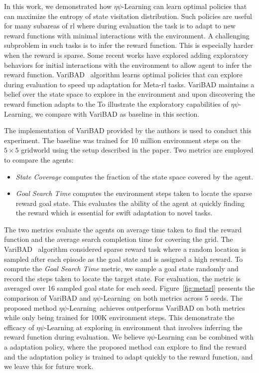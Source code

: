 \documentclass{article}
\theoremstyle{plain}
\theoremstyle{definition}
\theoremstyle{remark}
\newcommand{\alg}{$\eta$$\psi$-Learning}
\begin{document}
In this work, we demonstrated how $\eta\psi$-Learning can learn optimal policies that can maximize the entropy of state visitation distribution. Such policies are useful for many subareas of \gls{rl} where during evaluation the task is to adapt to new reward functions with minimal interactions with the environment. 
A challenging subproblem in such tasks is to infer the reward function. This is especially harder when the reward is sparse. 
Some recent works have explored adding exploratory behaviors for initial interactions with the environment to allow agent to infer the reward function. 
VariBAD~\citep{zintgraf2019varibad} algorithm learns optimal policies that can explore during evaluation to speed up adaptation for Meta-\gls{rl} tasks. 
VariBAD maintains a belief over the state space to explore in the environment and upon discovering the reward function adapts to the 
To illustrate the exploratory capabilities of \alg{}, we compare with VariBAD as baseline in this section. 

The implementation of VariBAD provided by the authors is used to conduct this experiment.
The baseline was trained for 10 million environment steps on the $5\times5$ gridworld using the setup described in the paper.
Two metrics are employed to compare the agents:
\begin{itemize}
    \item \textit{State Coverage} computes the fraction of the state space covered by the agent.
    \item \textit{Goal Search Time} computes the environment steps taken to locate the sparse reward goal state. This evaluates the ability of the agent at quickly finding the reward which is essential for swift adaptation to novel tasks.
\end{itemize}
The two metrics evaluate the agents on average time taken to find the reward function and the average search completion time for covering the grid. 
The VariBAD~\cite{zintgraf2019varibad} algorithm considered sparse reward task where a random location is sampled after each episode as the goal state and is assigned a high reward.  
To compute the \textit{Goal Search Time} metric, we sample a goal state randomly and record the steps taken to locate the target state.
For evaluation, the metric is averaged over 16 sampled goal state for each seed.
Figure~\ref{fig:metarl} presents the comparison of VariBAD and \alg{}~on both metrics across 5 seeds.
The proposed method \alg{}~achieves outperforms VariBAD on both metrics while only being trained for 100K environment steps. 
This demonstrate the efficacy of \alg{} at exploring in environment that involves inferring the reward function during evaluation. We believe \alg{} can be combined with a adaptation policy, where the proposed method can explore to find the reward and the adaptation policy is trained to adapt quickly to the reward function, and we leave this for future work.
\end{document}
